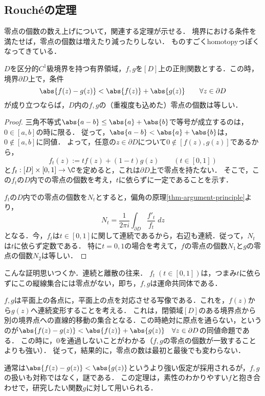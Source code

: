 \documentclass[uplatex, dvipdfmx]{jsreport}
\begin{document}
\subsection{Rouchéの定理}

\begin{screen}
    零点の個数の数え上げについて，関連する定理が示せる．
    境界における条件を満たせば，零点の個数は増えたり減ったりしない．
    ものすごくhomotopyっぽくなってきている．
\end{screen}

\begin{theorem}[Rouché]\label{thm-Rouché}
    $D$を区分的$C^1$級境界を持つ有界領域，$f,g$を$[D]$上の正則関数とする．この時，境界$\partial D$上で，条件
    \[\abs{f(z)-g(z)}<\abs{f(z)}+\abs{g(z)}\qquad\forall z\in\partial D\]
    が成り立つならば，$D$内の$f,g$の（重複度も込めた）零点の個数は等しい．
\end{theorem}
\begin{proof}
    三角不等式$\abs{a-b}\le\abs{a}+\abs{b}$で等号が成立するのは，$0\in[a,b]$の時に限る．
    従って，$\abs{a-b}<\abs{a}+\abs{b}$は，$0\notin[a,b]$に同値．
    よって，任意の$z\in\partial D$について$0\notin[f(z),g(z)]$であるから，
    \[f_t(z):=tf(z)+(1-t)g(z)\qquad(t\in[0,1])\]
    と$f_t:[D]\times[0,1]\to\C$を定めると，これは$\partial D$上で零点を持たない．
    そこで，この$f_t$の$D$内での零点の個数を考え，$t$に依らずに一定であることを示す．

    $f_t$の$D$内での零点の個数を$N_t$とすると，偏角の原理\ref{thm-argument-principle}より，
    \[N_t=\frac{1}{2\pi i}\int_{\partial D}\frac{f'_t}{f_t}\;dz\]
    となる．今，$f_t$は$t\in[0,1]$に関して連続であるから，右辺も連続．従って，$N_t$は$t$に依らず定数である．
    特に$t=0,1$の場合を考えて，$f$の零点の個数$N_1$と$g$の零点の個数$N_2$は等しい．
\end{proof}
\begin{remarks}
    こんな証明思いつくか．連続と離散の往来．
    $f_t\;(t\in[0,1])$は，つまみ$t$に依らずにこの縦線集合には零点がない，即ち，$f,g$は運命共同体である．

    $f,g$は平面上の各点に，平面上の点を対応させる写像である．これを，$f(z)$から$g(z)$へ連続変形することを考える．
    これは，閉領域$[D]$のある境界点から別の境界点への直線的移動の集合となる．この時絶対に原点を通らない，というのが$\abs{f(z)-g(z)}<\abs{f(z)}+\abs{g(z)}\quad\forall z\in\partial D$の同値命題である．
    この時に，$0$を通過しないことがわかる（$f,g$の零点の個数が一致することよりも強い）．
    従って，結果的に，零点の数は最初と最後でも変わらない．
\end{remarks}
\begin{remark}
    通常は$\abs{f(z)-g(z)}<\abs{g(z)}$というより強い仮定が採用されるが，$f,g$の扱いも対称ではなく，謎である．
    この定理は，素性のわかりやすい$f$と抱き合わせで，研究したい関数$g$に対して用いられる．
\end{remark}
\end{document}

